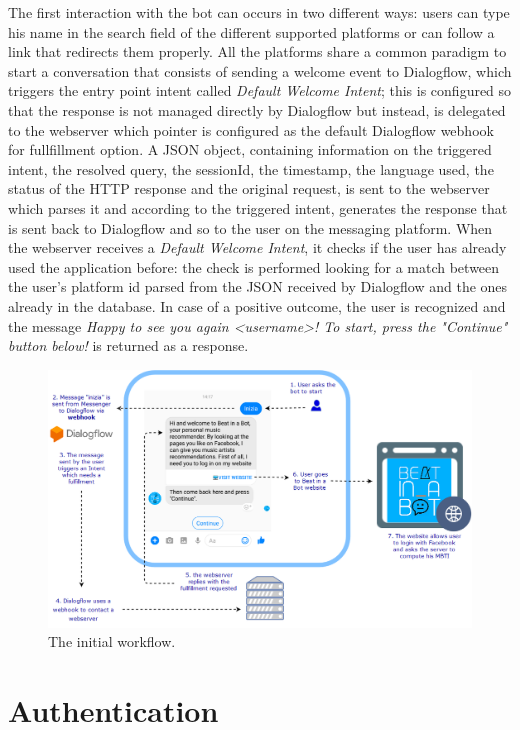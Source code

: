 \documentclass[b5paper,10pt,twoside,cucitura]{toptesi}
\begin{document}
The first interaction with the bot can occurs in two different ways: users can type his name in the search field of the different supported platforms or can follow a link that redirects them properly. All the platforms share a common paradigm to start a conversation that consists of sending a welcome event to Dialogflow, which triggers the entry point intent called \textit{Default Welcome Intent}; this is configured so that the response is not managed directly by Dialogflow but instead, is delegated to the webserver which pointer is configured as the default Dialogflow webhook for fullfillment option. A JSON object, containing information on the triggered intent, the resolved query, the sessionId, the timestamp, the language used, the status of the HTTP response and the original request, is sent to the webserver which parses it and according to the triggered intent, generates the response that is sent back to Dialogflow and so to the user on the messaging platform. When the webserver receives a \textit{Default Welcome Intent}, it checks if the user has already used the application before: the check is performed looking for a match between the user's platform id parsed from the JSON received by Dialogflow and the ones already in the database. In case of a positive outcome, the user is recognized and the message \textit{Happy to see you again <username>! To start, press the "Continue" button below!} is returned as a response.

\begin{figure}[ht]
\centering
\includegraphics[scale=0.32]{workflow_start.png}
\caption{The initial workflow.}
\end{figure}

\section{Authentication}
\end{document}
